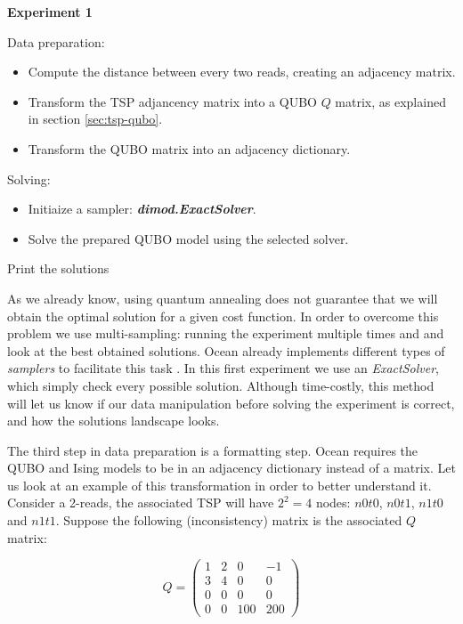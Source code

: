 \begin{algorithm}
	\caption*{\textbf{Experiment 1}}
	
	Data preparation:
	\begin{itemize}
		\item Compute the distance between every two reads, creating an adjacency matrix.
		\item Transform the TSP adjancency matrix into a QUBO $Q$ matrix, as explained in section \ref{sec:tsp-qubo}.
		\item Transform the QUBO matrix into an adjacency dictionary.
	\end{itemize}

	Solving:
	\begin{itemize}
		\item Initiaize a sampler: \textbf{\emph{dimod.ExactSolver}}.
		\item Solve the prepared QUBO model using the selected solver.
	\end{itemize}
	
	Print the solutions
\end{algorithm}

As we already know, using quantum annealing does not guarantee that we will obtain the optimal solution for a given cost function. In order to overcome this problem we use multi-sampling: running the experiment multiple times and and look at the best obtained solutions. Ocean already implements different types of \emph{samplers} to facilitate this task \cite{DWave-OceanDoc-Samplers}. In this first experiment we use an \emph{ExactSolver}, which simply check every possible solution. Although time-costly, this method will let us know if our data manipulation before solving the experiment is correct, and how the solutions landscape looks.

The third step in data preparation is a formatting step. Ocean requires the QUBO and Ising models to be in an adjacency dictionary instead of a matrix. Let us look at an example of this transformation in order to better understand it. Consider a 2-reads, the associated TSP will have $2^2 = 4$ nodes: $n0t0$, $n0t1$, $n1t0$ and $n1t1$. Suppose the following (inconsistency) matrix is the associated $Q$ matrix:

$$
Q = 
\left(
\begin{array}{cccc}
	1 & 2 & 0 & -1 \\
	3 & 4 & 0 & 0 \\
	0 & 0 & 0 & 0 \\
	0 & 0 & 100 & 200 
\end{array}
\right)
$$


